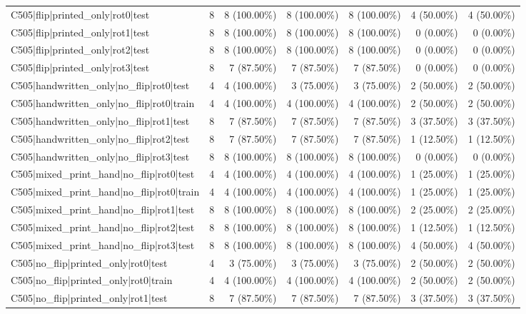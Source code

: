 \begin{longtable}{>{\raggedright\arraybackslash}p{5cm}rrrrrr}
C505|flip|printed\_only|rot0|test & 8 & 8 (100.00\%) & 8 (100.00\%) & 8 (100.00\%) & 4 (50.00\%) & 4 (50.00\%) \\
C505|flip|printed\_only|rot1|test & 8 & 8 (100.00\%) & 8 (100.00\%) & 8 (100.00\%) & 0 (0.00\%) & 0 (0.00\%) \\
C505|flip|printed\_only|rot2|test & 8 & 8 (100.00\%) & 8 (100.00\%) & 8 (100.00\%) & 0 (0.00\%) & 0 (0.00\%) \\
C505|flip|printed\_only|rot3|test & 8 & 7 (87.50\%) & 7 (87.50\%) & 7 (87.50\%) & 0 (0.00\%) & 0 (0.00\%) \\
C505|handwritten\_only|no\_flip|rot0|test & 4 & 4 (100.00\%) & 3 (75.00\%) & 3 (75.00\%) & 2 (50.00\%) & 2 (50.00\%) \\
C505|handwritten\_only|no\_flip|rot0|train & 4 & 4 (100.00\%) & 4 (100.00\%) & 4 (100.00\%) & 2 (50.00\%) & 2 (50.00\%) \\
C505|handwritten\_only|no\_flip|rot1|test & 8 & 7 (87.50\%) & 7 (87.50\%) & 7 (87.50\%) & 3 (37.50\%) & 3 (37.50\%) \\
C505|handwritten\_only|no\_flip|rot2|test & 8 & 7 (87.50\%) & 7 (87.50\%) & 7 (87.50\%) & 1 (12.50\%) & 1 (12.50\%) \\
C505|handwritten\_only|no\_flip|rot3|test & 8 & 8 (100.00\%) & 8 (100.00\%) & 8 (100.00\%) & 0 (0.00\%) & 0 (0.00\%) \\
C505|mixed\_print\_hand|no\_flip|rot0|test & 4 & 4 (100.00\%) & 4 (100.00\%) & 4 (100.00\%) & 1 (25.00\%) & 1 (25.00\%) \\
C505|mixed\_print\_hand|no\_flip|rot0|train & 4 & 4 (100.00\%) & 4 (100.00\%) & 4 (100.00\%) & 1 (25.00\%) & 1 (25.00\%) \\
C505|mixed\_print\_hand|no\_flip|rot1|test & 8 & 8 (100.00\%) & 8 (100.00\%) & 8 (100.00\%) & 2 (25.00\%) & 2 (25.00\%) \\
C505|mixed\_print\_hand|no\_flip|rot2|test & 8 & 8 (100.00\%) & 8 (100.00\%) & 8 (100.00\%) & 1 (12.50\%) & 1 (12.50\%) \\
C505|mixed\_print\_hand|no\_flip|rot3|test & 8 & 8 (100.00\%) & 8 (100.00\%) & 8 (100.00\%) & 4 (50.00\%) & 4 (50.00\%) \\
C505|no\_flip|printed\_only|rot0|test & 4 & 3 (75.00\%) & 3 (75.00\%) & 3 (75.00\%) & 2 (50.00\%) & 2 (50.00\%) \\
C505|no\_flip|printed\_only|rot0|train & 4 & 4 (100.00\%) & 4 (100.00\%) & 4 (100.00\%) & 2 (50.00\%) & 2 (50.00\%) \\
C505|no\_flip|printed\_only|rot1|test & 8 & 7 (87.50\%) & 7 (87.50\%) & 7 (87.50\%) & 3 (37.50\%) & 3 (37.50\%) \\

\end{longtable}
